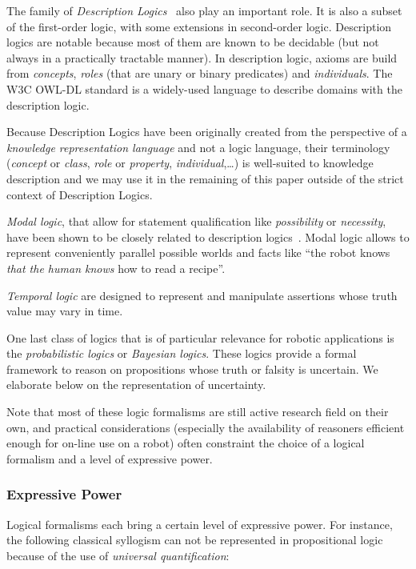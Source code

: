 The family of \emph{Description Logics}~\cite{Baader2008} also play an
important role. It is also a subset of the first-order logic, with some
extensions in second-order logic. Description logics are notable because most
of them are known to be decidable (but not always in a practically tractable
manner). In description logic, axioms are build from \emph{concepts},
\emph{roles} (that are unary or binary predicates) and \emph{individuals}. The
W3C OWL-DL standard is a widely-used language to describe domains with the
description logic.

Because Description Logics have been originally created from the perspective of
a \emph{knowledge representation language} and not a logic language, their
terminology (\emph{concept} or \emph{class}, \emph{role} or \emph{property},
\emph{individual},\ldots) is well-suited to knowledge description and we may use
it in the remaining of this paper outside of the strict context of  Description
Logics.

\emph{Modal logic}, that allow for statement qualification like
\emph{possibility} or \emph{necessity}, have been shown to be closely related
to description logics~\cite{Baader2001}. Modal logic allows to represent conveniently parallel
possible worlds and facts like ``the robot knows \emph{that the human knows}
how to read a recipe''.


\emph{Temporal logic} are designed to represent and manipulate assertions whose
truth value may vary in time.

One last class of logics that is of particular relevance for robotic
applications is the \emph{probabilistic logics} or \emph{Bayesian logics}.
These logics provide a formal framework to reason on propositions whose truth
or falsity is uncertain. We elaborate below on the representation of uncertainty.

Note that most of these logic formalisms are still active research field on
their own, and practical considerations (especially the availability of
reasoners efficient enough for on-line use on a robot) often constraint the
choice of a logical formalism and a level of expressive power.

\subsubsection{Expressive Power}

Logical formalisms each bring a certain level of expressive power. For
instance, the following classical syllogism can not be represented in
propositional logic because of the use of \emph{universal quantification}:

